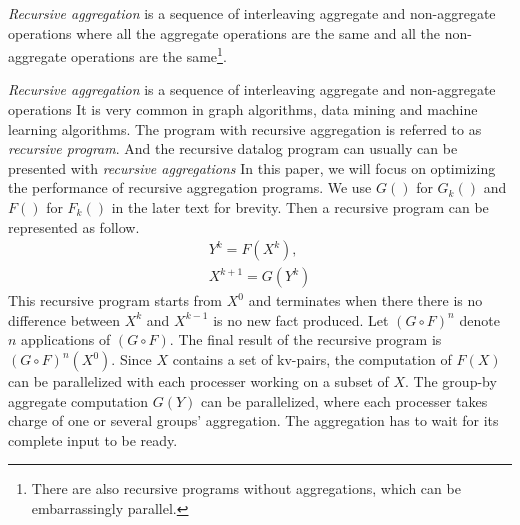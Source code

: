 {\color{green}
\emph{Recursive aggregation} is a sequence of interleaving aggregate and non-aggregate operations 
where all the aggregate operations are the same and all the non-aggregate operations are the same\footnote{There are also recursive programs without aggregations, which can be embarrassingly parallel.}. }

{\color{red}
	\emph{Recursive aggregation} is a sequence of interleaving aggregate and non-aggregate operations 
It is very common in graph algorithms, data mining and machine learning algorithms. The program with recursive aggregation is referred to as \emph{recursive program}. And the recursive datalog program can usually can be presented with \emph{recursive aggregations} In this paper, we will focus on optimizing the performance of recursive aggregation programs.
}
We use $G()$ for $G_k()$ and $F()$ for $F_k()$ in the later text for brevity. Then a recursive program can be represented as follow.
\begin{equation}
\label{eq:recursive2}
\begin{aligned}
Y^{k}=F(X^k),\\
X^{k+1}=G(Y^k)
\end{aligned}
\end{equation}
This recursive program starts from $X^0$ and terminates when there {\color{green}there is no difference between $X^k$ and $X^{k-1}$} is no new fact produced. Let $(G\circ F)^n$ denote $n$ applications of $(G\circ F)$. The final result of the recursive program is $(G\circ F)^n(X^0)$. Since $X$ contains a set of kv-pairs, the computation of $F(X)$ can be parallelized with each processer working on a subset of $X$. The group-by aggregate computation $G(Y)$ can be parallelized, where each processer takes charge of one or several groups' aggregation. The aggregation has to wait for its complete input 
 to be ready. 

